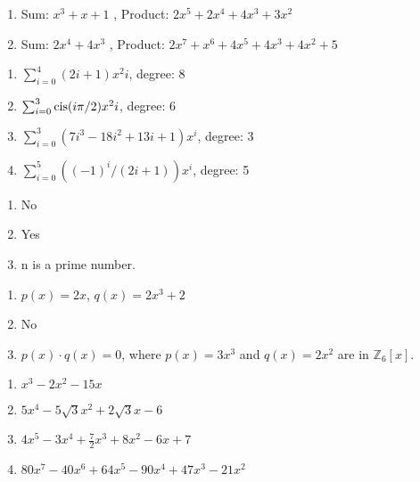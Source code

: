 \begin {enumerate} [(1)]
\item
 Sum: $x^3+x+1$ , Product: $2x^5+2x^4+4x^3+3x^2$
\item
 Sum: $2x^4+4x^3$ , Product: $2x^7+x^6+4x^5+4x^3+4x^2+5$
\end {enumerate}

\begin {enumerate} [(1)]
\item
 $\sum_{i=0}^{4} (2i+1)x^2i$, degree: 8
\item
 $\sum_{i=0}^{3} \operatorname{cis}(i\pi/2)x^2i$, degree: 6
\item 
$\sum_{i=0}^{3} (7i^3-18i^2+13i+1)x^i$, degree: 3
\item
 $\sum_{i=0}^{5} ((-1)^i/(2i+1))x^i$, degree: 5
\end {enumerate}

\begin {enumerate} [(1)]
\item
 No
\item 
Yes
\item
 n is a prime number.
\end {enumerate}

\begin {enumerate} [(1)]
\item
 $p(x)=2x$, $q(x)=2x^3+2$
\item 
No
\item
 $p(x) \cdot q(x)=0$, where $p(x)=3x^3$ and $q(x)=2x^2$ are in $\mathbb{Z}_6[x]$.
\end {enumerate}

\begin {enumerate} [(1)]
\item 
 $x^3-2x^2-15x$
\item
 $5x^4-5\sqrt{3}x^2+2\sqrt{3}x-6$
\item
$4x^5-3x^4+\frac{7}{2}x^3+8x^2-6x+7$
\item
$80x^7-40x^6+64x^5-90x^4+47x^3-21x^2$
\end {enumerate}

